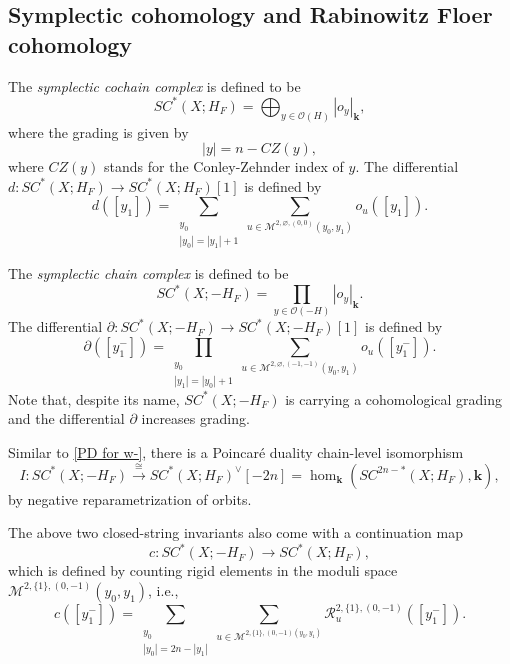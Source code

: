 \documentclass[11pt]{amsproc}
\def\K{{\mathbf{k}}}
\def\o{\mathcal{O}}
\def\cR{\mathcal{R}}
\def\M{\mathcal{M}}
\def\p{\partial}
\theoremstyle{remark}
\numberwithin{equation}{section}
\begin{document}
\subsection{Symplectic cohomology and Rabinowitz Floer cohomology}

The {\it symplectic cochain complex} is defined to be
\begin{equation}\label{symplectic cochains}
SC^{*}(X; H_{F}) = \bigoplus_{y \in \o(H)} |o_{y}|_{\K},
\end{equation}
where the grading is given by
\begin{equation}
|y| = n - CZ(y),
\end{equation}
where $CZ(y)$ stands for the Conley-Zehnder index of $y$.
The differential $d: SC^{*}(X; H_{F})  \to SC^{*}(X; H_{F}) [1]$ is defined by
\begin{equation}
d([y_{1}]) = \sum_{\substack{y_{0}\\ |y_{0}| = |y_{1}|+1}} \sum_{u \in \M^{2, \varnothing, (0, 0)}(y_{0}, y_{1})} o_{u}([y_{1}]).
\end{equation}

The {\it symplectic chain complex} is defined to be
\begin{equation}\label{symplectic chains}
SC^{*}(X; -H_{F})  = \prod_{y \in \o(-H)} |o_{y}|_{\K}.
\end{equation}
The differential $\p: SC^{*}(X; -H_{F}) \to SC^{*}(X; -H_{F})[1]$ is defined by
\begin{equation}
\p ([y_{1}^{-}]) = \prod_{\substack{y_{0} \\ |y_{1}| = |y_{0}|+1}} \sum_{u \in \M^{2, \varnothing, (-1, -1)}(y_{0}, y_{1})} o_{u}([y_{1}^{-}]).
\end{equation} 
Note that, despite its name, $SC^{*}(X; -H_{F})$ is carrying a cohomological grading and the differential $\p$ increases grading.

Similar to \eqref{PD for w-}, there is a Poincar\'{e} duality chain-level isomorphism
\begin{equation}\label{PD for sc-}
I: SC^{*}(X; -H_{F})  \stackrel{\cong}\to SC^{*}(X; H_{F}) ^{\vee}[-2n] = \hom_{\K}(SC^{2n-*}(X; H_{F}), \K),
\end{equation}
by negative reparametrization of orbits.

The above two closed-string invariants also come with a continuation map
\begin{equation}\label{closed-string continuation map}
c: SC^{*}(X; -H_{F})  \to SC^{*}(X; H_{F}) ,
\end{equation}
which is defined by counting rigid elements in the moduli space $\M^{2, \{1\}, (0, -1)}(y_{0}, y_{1})$, i.e.,
\begin{equation}\label{closed-string continuation map formula}
c([y_{1}^{-}]) = \sum_{\substack{y_{0}\\|y_{0}| = 2n - |y_{1}|}} \sum_{u \in \M^{2, \{1\}, (0, -1)(y_{0}, y_{1})}} \cR^{2, \{1\}, (0, -1)}_{u}([y_{1}^{-}]).
\end{equation}
\end{document}
